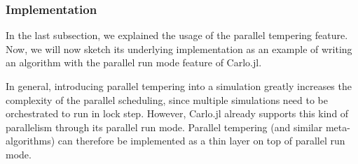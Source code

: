 \documentclass{SciPost}
\begin{document}
\subsubsection{Implementation}
In the last subsection, we explained the usage of the parallel tempering feature. Now, we will now sketch its underlying implementation as an example of writing an algorithm with the parallel run mode feature of Carlo.jl.

In general, introducing parallel tempering into a simulation greatly increases the complexity of the parallel scheduling, since multiple simulations need to be orchestrated to run in lock step. However, Carlo.jl already supports this kind of parallelism through its parallel run mode. Parallel tempering (and similar meta-algorithms) can therefore be implemented as a thin layer on top of parallel run mode. 
\end{document}
